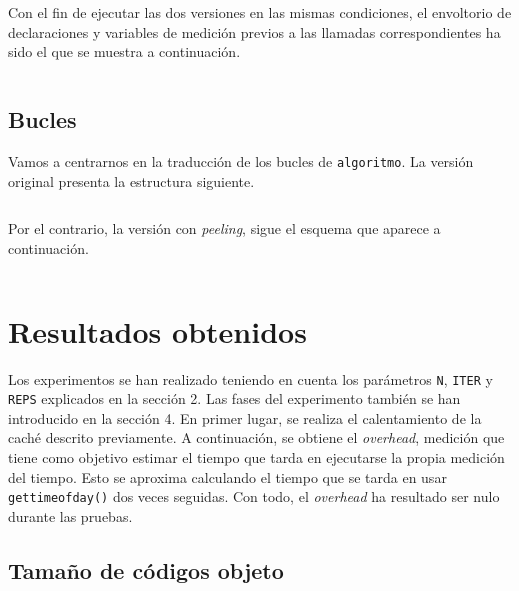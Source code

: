 \documentclass[11pt,a4paper,twoside]{article}
\theoremstyle{definition}
\begin{document}
	Con el fin de ejecutar las dos versiones en las mismas condiciones, el envoltorio de declaraciones y variables de medición previos a las llamadas correspondientes ha sido el que se muestra a continuación.
	
	\begin{verbatim}

	\end{verbatim}

	\subsection{Bucles}
	
	Vamos a centrarnos en la traducción de los bucles de \texttt{algoritmo}. La versión original presenta la estructura siguiente.
	
	\begin{verbatim}

	\end{verbatim}

	Por el contrario, la versión con \textit{peeling}, sigue el esquema que aparece a continuación.
	
	\begin{verbatim}

	\end{verbatim}
											
	
	\section{Resultados obtenidos}
	
	Los experimentos se han realizado teniendo en cuenta los parámetros \texttt{N}, \texttt{ITER} y \texttt{REPS} explicados en la sección 2. Las fases del experimento también se han introducido en la sección 4. En primer lugar, se realiza el calentamiento de la caché descrito previamente. A continuación, se obtiene el \textit{overhead}, medición que tiene como objetivo estimar el tiempo que tarda en ejecutarse la propia medición del tiempo. Esto se aproxima calculando el tiempo que se tarda en usar \texttt{gettimeofday()} dos veces seguidas. Con todo, el \textit{overhead} ha resultado ser nulo durante las pruebas.
	
	\subsection{Tamaño de códigos objeto}
	
\end{document}
